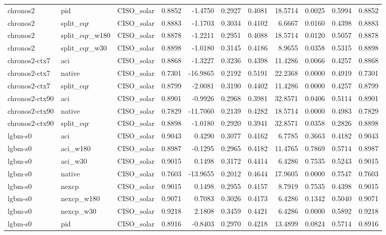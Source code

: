 \begin{tabular}{lllrrrrrrrr}
chronos2 & pid & CISO_solar & 0.8852 & -1.4750 & 0.2927 & 0.4081 & 18.5714 & 0.0025 & 0.5994 & 0.8852 \\
chronos2 & split_cqr & CISO_solar & 0.8883 & -1.1703 & 0.3034 & 0.4102 & 6.6667 & 0.0160 & 0.4398 & 0.8883 \\
chronos2 & split_cqr_w180 & CISO_solar & 0.8878 & -1.2211 & 0.2951 & 0.4088 & 18.5714 & 0.0120 & 0.5057 & 0.8878 \\
chronos2 & split_cqr_w30 & CISO_solar & 0.8898 & -1.0180 & 0.3145 & 0.4186 & 8.9655 & 0.0358 & 0.5315 & 0.8898 \\
chronos2-ctx7 & aci & CISO_solar & 0.8868 & -1.3227 & 0.3236 & 0.4398 & 11.4286 & 0.0066 & 0.4257 & 0.8868 \\
chronos2-ctx7 & native & CISO_solar & 0.7301 & -16.9865 & 0.2192 & 0.5191 & 22.2368 & 0.0000 & 0.4919 & 0.7301 \\
chronos2-ctx7 & split_cqr & CISO_solar & 0.8799 & -2.0081 & 0.3190 & 0.4402 & 11.4286 & 0.0000 & 0.4257 & 0.8799 \\
chronos2-ctx90 & aci & CISO_solar & 0.8901 & -0.9926 & 0.2968 & 0.3981 & 32.8571 & 0.0406 & 0.5114 & 0.8901 \\
chronos2-ctx90 & native & CISO_solar & 0.7829 & -11.7060 & 0.2139 & 0.4282 & 18.5714 & 0.0000 & 0.4983 & 0.7829 \\
chronos2-ctx90 & split_cqr & CISO_solar & 0.8898 & -1.0180 & 0.2920 & 0.3941 & 32.8571 & 0.0358 & 0.2826 & 0.8898 \\
lgbm-s0 & aci & CISO_solar & 0.9043 & 0.4290 & 0.3077 & 0.4162 & 6.7785 & 0.3663 & 0.4182 & 0.9043 \\
lgbm-s0 & aci_w180 & CISO_solar & 0.8987 & -0.1295 & 0.2965 & 0.4182 & 11.4765 & 0.7869 & 0.5714 & 0.8987 \\
lgbm-s0 & aci_w30 & CISO_solar & 0.9015 & 0.1498 & 0.3172 & 0.4414 & 6.4286 & 0.7535 & 0.5243 & 0.9015 \\
lgbm-s0 & native & CISO_solar & 0.7603 & -13.9655 & 0.2012 & 0.4644 & 17.9605 & 0.0000 & 0.7547 & 0.7603 \\
lgbm-s0 & nexcp & CISO_solar & 0.9015 & 0.1498 & 0.2955 & 0.4157 & 8.7919 & 0.7535 & 0.4398 & 0.9015 \\
lgbm-s0 & nexcp_w180 & CISO_solar & 0.9071 & 0.7083 & 0.3026 & 0.4173 & 6.4286 & 0.1342 & 0.5040 & 0.9071 \\
lgbm-s0 & nexcp_w30 & CISO_solar & 0.9218 & 2.1808 & 0.3459 & 0.4421 & 6.4286 & 0.0000 & 0.5892 & 0.9218 \\
lgbm-s0 & pid & CISO_solar & 0.8916 & -0.8403 & 0.2970 & 0.4218 & 13.4899 & 0.0824 & 0.5714 & 0.8916 \\

\end{tabular}
